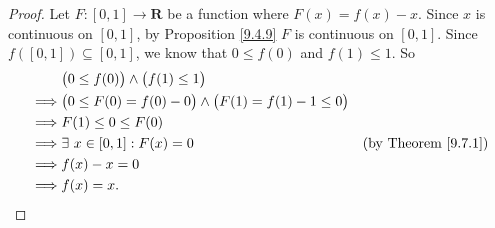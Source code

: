 \begin{proof}
    Let \(F : [0, 1] \to \mathbf{R}\) be a function where \(F(x) = f(x) - x\).
    Since \(x\) is continuous on \([0, 1]\), by Proposition \ref{9.4.9} \(F\) is continuous on \([0, 1]\).
    Since \(f([0, 1]) \subseteq [0, 1]\), we know that \(0 \leq f(0)\) and \(f(1) \leq 1\).
    So
    \begin{align*}
        & \big(0 \leq f(0)\big) \land \big(f(1) \leq 1\big) \\
        \implies & \big(0 \leq F(0) = f(0) - 0\big) \land \big(F(1) = f(1) - 1 \leq 0\big) \\
        \implies & F(1) \leq 0 \leq F(0) \\
        \implies & \exists\ x \in [0, 1] : F(x) = 0 & \text{(by Theorem \ref{9.7.1})} \\
        \implies & f(x) - x = 0 \\
        \implies & f(x) = x.
    \end{align*}
\end{proof}